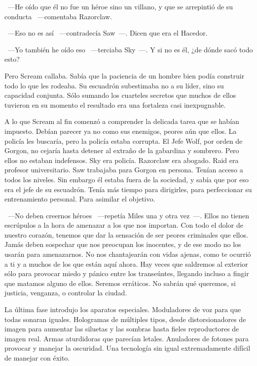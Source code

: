 ~---He oído que él no fue un héroe sino un villano, y que se arrepintió de su conducta ~---comentaba Razorclaw.

~---Eso no es así ~---contradecía Saw~---. Dicen que era el Hacedor.

~---Yo también he oído eso ~---terciaba Sky~---. Y si no es él, ¿de dónde sacó todo esto?

Pero Scream callaba. Sabía que la paciencia de un hombre bien podía construir todo lo que les rodeaba. Su escuadrón subestimaba no a su líder, sino su capacidad conjunta. Sólo sumando los cuarteles secretos que muchos de ellos tuvieron en su momento el resultado era una fortaleza casi inexpugnable.

A lo que Scream al fin comenzó a comprender la delicada tarea que se habían impuesto. Debían parecer ya no como sus enemigos, peores aún que ellos. La policía les buscaría, pero la policía estaba corrupta. El Jefe Wolf, por orden de Gorgon, no cejaría hasta detener al extraño de la gabardina y sombrero. Pero ellos no estaban indefensos. Sky era policía. Razorclaw era abogado. Raid era profesor universitario. Saw trabajaba para Gorgon en persona. Tenían acceso a todos los niveles. Sin embargo él estaba fuera de la sociedad, y sabía que por eso era el jefe de su escuadrón. Tenía más tiempo para dirigirles, para perfeccionar su entrenamiento personal. Para asimilar el objetivo.

~---No deben creernos héroes ~---repetía Miles una y otra vez~---. Ellos no tienen escrúpulos a la hora de amenazar a los que nos importan. Con todo el dolor de nuestro corazón, tenemos que dar la sensación de ser peores criminales que ellos. Jamás deben sospechar que nos preocupan los inocentes, y de ese modo no los usarán para amenazarnos. No nos chantajearán con vidas ajenas, como te ocurrió a ti y a muchos de los que están aquí ahora. Hay veces que saldremos al exterior sólo para provocar miedo y pánico entre los transeúntes, llegando incluso a fingir que matamos alguno de ellos. Seremos erráticos. No sabrán qué queremos, si justicia, venganza, o controlar la ciudad.

La última fase introdujo los aparatos especiales. Moduladores de voz para que todas sonaran iguales. Hologramas de múltiples tipos, desde distorsionadores de imagen para aumentar las siluetas y las sombras hasta fieles reproductores de imagen real. Armas aturdidoras que parecían letales. Anuladores de fotones para provocar y manejar la oscuridad. Una tecnología sin igual extremadamente difícil de manejar con éxito.

